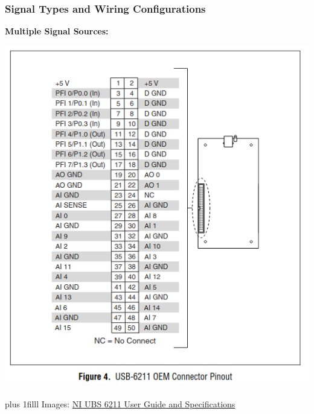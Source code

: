 \documentclass[fleqn]{beamer} %
\newcommand{\sectionIIsubsectionItitle}{Signal Types and Wiring Configurations}
\newcommand{\btVFill}{\vskip0pt plus 1filll}
\begin{document}
     \begin{frame}[label=sectionIIsubsectionI]
         \frametitle{\sectionIIsubsectionItitle} \scriptsize
 
         \textbf{Multiple Signal Sources:}\vspcc
 
         \includegraphics[scale=.25]{images/usb6211_IOconnector.png}
         
         \btVFill
         \tiny{Images: \href{https://www.ni.com/docs/en-US/bundle/usb-621x-oem-features/resource/372083c.pdf}{NI     UBS 6211 User Guide and Specifications}}
         \end{frame} 
\end{document}
